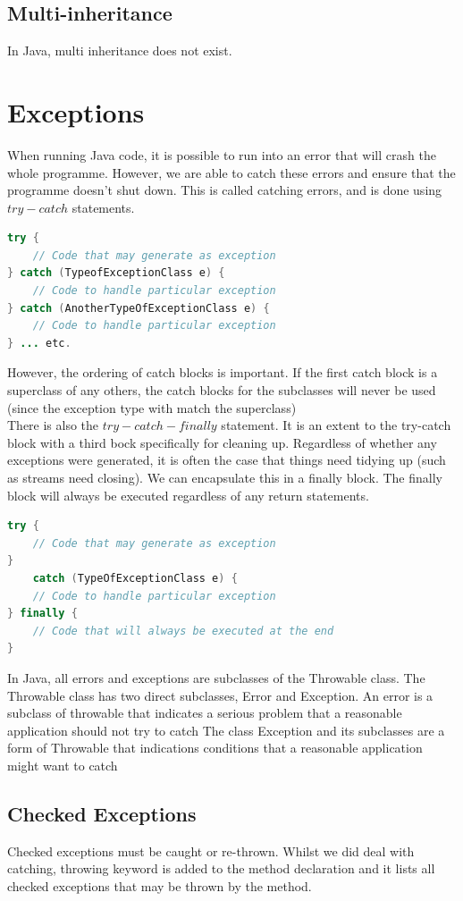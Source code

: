\documentclass[11pt,a4 paper]{book}
\theoremstyle{plain}
\theoremstyle{definition}
\theoremstyle{remark}
\begin{document}
\begin{flushleft}
\subsection{Multi-inheritance}
In Java, multi inheritance does not exist.
\section{Exceptions}
When running Java code, it is possible to run into an error that will crash the whole programme. However, we are able to catch these errors and ensure that the programme doesn't shut down. This is called catching errors, and is done using $try-catch$ statements.
\begin{lstlisting}[language = Java]
try {
	// Code that may generate as exception
} catch (TypeofExceptionClass e) {
	// Code to handle particular exception
} catch (AnotherTypeOfExceptionClass e) {
	// Code to handle particular exception
} ... etc.
\end{lstlisting}
However, the ordering of catch blocks is important.
If the first catch block is a superclass of any others, the catch blocks for the subclasses will never be used (since the exception type with match the superclass) \\
There is also the $try-catch-finally$ statement. It is an extent to the try-catch block with a third bock specifically for cleaning up.
Regardless of whether any exceptions were generated, it is often the case that things need tidying up (such as streams need closing). We can encapsulate this in a finally block. The finally block will always be executed regardless of any return statements. 
\begin{lstlisting}[language = Java]
try {
	// Code that may generate as exception
}
	catch (TypeOfExceptionClass e) {
	// Code to handle particular exception
} finally {
	// Code that will always be executed at the end
}
\end{lstlisting}
In Java, all errors and exceptions are subclasses of the Throwable class. The Throwable class has two direct subclasses, Error and Exception. An error is a subclass of throwable that indicates a serious problem that a reasonable application should not try to catch
The class Exception and its subclasses are a form of Throwable that indications conditions that a reasonable application might want to catch
\subsection{Checked Exceptions}
Checked exceptions must be caught or re-thrown. Whilst we did deal with catching, throwing keyword is added to the method declaration and it lists all checked exceptions that may be thrown by the method. 

\end{flushleft}
\end{document}
